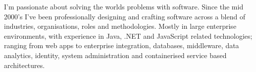 \par{
  I'm passionate about solving the worlds problems with software. Since the mid 
  2000's I've been professionally designing and crafting software across a 
  blend of industries, organisations, roles and methodologies. Mostly in large 
  enterprise environments, with experience in Java, .NET and JavaScript related 
  technologies; ranging from web apps to enterprise integration, databases, 
  middleware, data analytics, identity, system administration and containerised 
  service based architectures.
}

